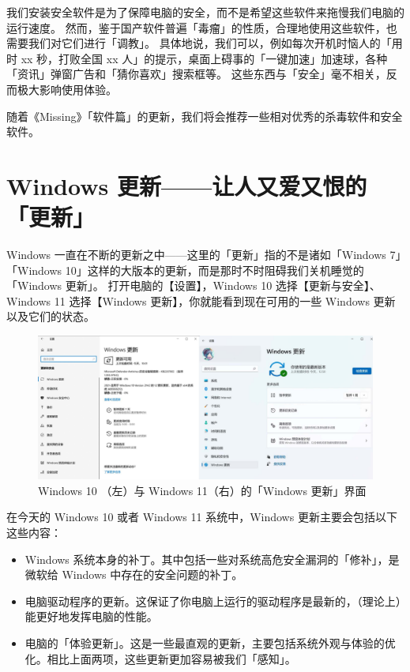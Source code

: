 我们安装安全软件是为了保障电脑的安全，而不是希望这些软件来拖慢我们电脑的运行速度。
然而，鉴于国产软件普遍「毒瘤」的性质，合理地使用这些软件，也需要我们对它们进行「调教」。
具体地说，我们可以，例如每次开机时恼人的「用时 xx 秒，打败全国 xx 人」的提示，桌面上碍事的「一键加速」加速球，各种「资讯」弹窗广告和「猜你喜欢」搜索框等。
这些东西与「安全」毫不相关，反而极大影响使用体验。

随着《Missing》「软件篇」的更新，我们将会推荐一些相对优秀的杀毒软件和安全软件。

\section{Windows 更新——让人又爱又恨的「更新」}

Windows 一直在不断的更新之中——这里的「更新」指的不是诸如「Windows 7」「Windows 10」这样的大版本的更新，而是那时不时阻碍我们关机睡觉的「Windows 更新」。
打开电脑的【设置】，Windows 10 选择【更新与安全】、Windows 11 选择【Windows 更新】，你就能看到现在可用的一些 Windows 更新以及它们的状态。

\begin{figure}[htb!]
  \centering
  \includegraphics[width=13cm]{assets/Windows_Update.jpg}
  \caption{Windows 10 （左）与 Windows 11（右）的「Windows 更新」界面}
  \label{Windows_Update}
\end{figure}

在今天的 Windows 10 或者 Windows 11 系统中，Windows 更新主要会包括以下这些内容：

\begin{itemize}
  \item Windows 系统本身的补丁。其中包括一些对系统高危安全漏洞的「修补」，是微软给 Windows 中存在的安全问题的补丁。
  \item 电脑驱动程序的更新。这保证了你电脑上运行的驱动程序是最新的，（理论上）能更好地发挥电脑的性能。
  \item 电脑的「体验更新」。这是一些最直观的更新，主要包括系统外观与体验的优化。相比上面两项，这些更新更加容易被我们「感知」。
\end{itemize}


